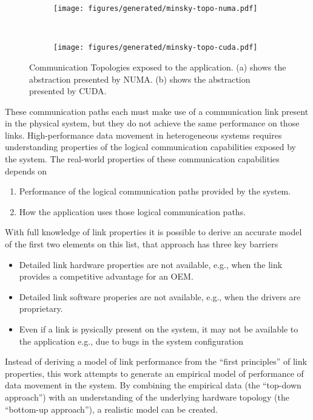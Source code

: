 \begin{figure}[ht]
    \centering
    \begin{subfigure}[b]{0.45\textwidth}
        \texttt{[image: figures/generated/minsky-topo-numa.pdf]}
        \caption{}
        \label{fig:minsky-topo-numa}
    \end{subfigure}
    ~
    \begin{subfigure}[b]{0.45\textwidth}
        \texttt{[image: figures/generated/minsky-topo-cuda.pdf]}
        \caption{}
        \label{fig:minsky-topo-cuda}
    \end{subfigure}
    \caption[Communication Topologies Exposed to Application]{
        Communication Topologies exposed to the application.
        (a) shows the abstraction presented by NUMA.
        (b) shows the abstraction presented by CUDA.
    }
    \label{fig:minsky-abstraction}
\end{figure}

These communication paths each must make use of a communication link present in the physical system, but they do not achieve the same performance on those links.
High-performance data movement in heterogeneous systems requires understanding properties of the logical communication capabilities exposed by the system.
The real-world properties of these communication capabilities depends on 
\begin{enumerate}
    \item Performance of the logical communication paths provided by the system.
    \item How the application uses those logical communication paths.
\end{enumerate}

With full knowledge of link properties it is possible to derive an accurate model of the first two elements on this list, that approach has three key barriers
\begin{itemize}
    \item Detailed link hardware properties are not available, e.g., when the link provides a competitive advantage for an OEM.
    \item Detailed link software properies are not available, e.g., when the drivers are proprietary.
    \item Even if a link is pysically present on the system, it may not be available to the application {e.g., due to bugs in the system configuration}
\end{itemize}
Instead of deriving a model of link performance from the ``first principles'' of link properties, this work attempts to generate an empirical model of performance of data movement in the system.
By combining the empirical data (the ``top-down approach'') with an understanding of the underlying hardware topology (the ``bottom-up approach''), a realistic model can be created.



